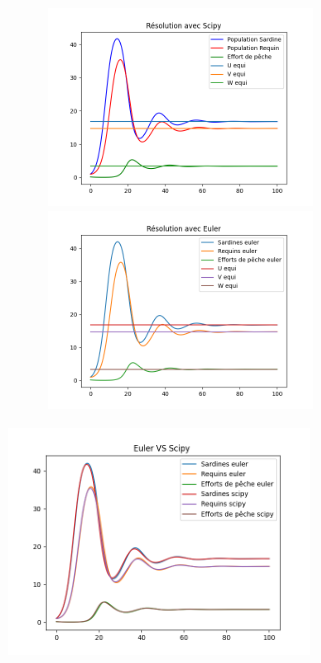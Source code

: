 \documentclass[a4paper, 11pt]{report}%
\begin{document}
        \begin{figure}[!h]
    		\begin{minipage}[b]{.4\textwidth}
        		\centering
        		\includegraphics[width=7cm]{figures/Scipy_good_conditions.png}
    		\end{minipage}
    		\hfill
    		\begin{minipage}[b]{.4\textwidth}
        		\centering
       			\includegraphics[width=7cm]{figures/Euler_good_conditions.png}
    		\end{minipage}
    		
		\end{figure}

        \begin{center}
            \includegraphics[width=8cm]{figures/Euler_VS_Scipy_good_conditions.png}
        \end{center}
\end{document}
